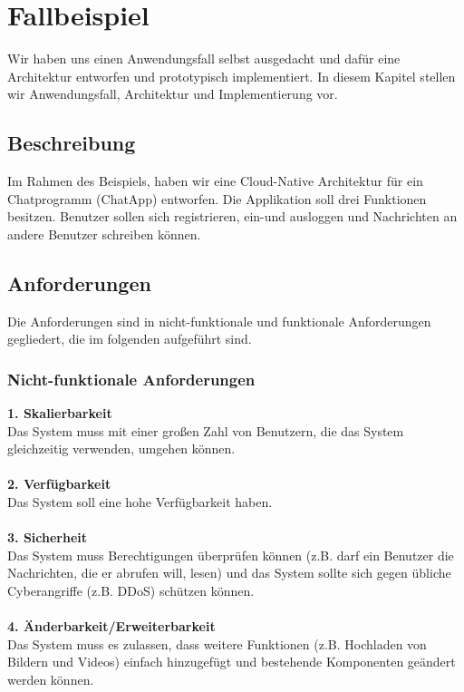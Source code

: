 \chapter{Fallbeispiel}
Wir haben uns einen Anwendungsfall selbst ausgedacht und dafür eine Architektur entworfen und prototypisch implementiert. In diesem Kapitel stellen wir Anwendungsfall, Architektur und Implementierung vor.

\section{Beschreibung}
Im Rahmen des Beispiels, haben wir eine Cloud-Native Architektur für ein Chatprogramm (ChatApp) entworfen. Die Applikation soll drei Funktionen besitzen. Benutzer sollen sich registrieren, ein-und ausloggen und Nachrichten an andere Benutzer schreiben können.

\section{Anforderungen}
Die Anforderungen sind in nicht-funktionale und funktionale Anforderungen gegliedert, die im folgenden aufgeführt sind.
\subsection{Nicht-funktionale Anforderungen}
\textbf{1. Skalierbarkeit}\\
Das System muss mit einer großen Zahl von Benutzern, die das System gleichzeitig verwenden, umgehen können.\\
\\
\textbf{2. Verfügbarkeit}\\
Das System soll eine hohe Verfügbarkeit haben.\\
\\
\textbf{3. Sicherheit}\\
Das System muss Berechtigungen überprüfen können (z.B. darf ein Benutzer die Nachrichten, die er abrufen will, lesen) und das System sollte sich gegen übliche Cyberangriffe (z.B. \ac{DDoS}) schützen können.\\
\\
\textbf{4. Änderbarkeit/Erweiterbarkeit}\\
Das System muss es zulassen, dass weitere Funktionen (z.B. Hochladen von Bildern und Videos) einfach hinzugefügt und bestehende Komponenten geändert werden können.

